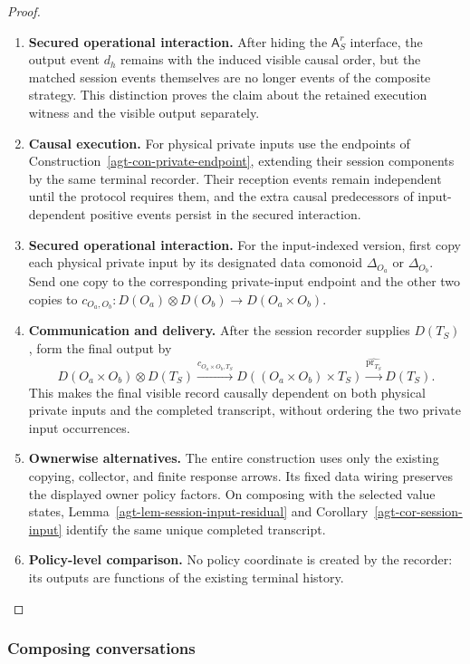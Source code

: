 \documentclass[11pt,a4paper]{article}
\numberwithin{equation}{section}
\theoremstyle{definition}
\theoremstyle{remark}
\theoremstyle{plain}
\begin{document}
\begin{proof}
\begin{enumerate}[label=\textup{(\arabic*)},leftmargin=*,itemsep=4pt,topsep=3pt]
completed matching explicitly records the internal session events and
the final record occurrence.
  \item \textbf{Secured operational interaction.} After hiding the $\mathsf A_S^r$
interface, the output event $d_h$ remains with the induced visible
causal order, but the matched session events themselves are no longer
events of the composite strategy. This distinction proves the claim
about the retained execution witness and the visible output separately.
  \item \textbf{Causal execution.} For physical private inputs use the endpoints of
Construction~\ref{agt-con-private-endpoint}, extending their session
components by the same terminal recorder. Their reception events
remain independent until the protocol requires them, and the extra
causal predecessors of input-dependent positive events persist in the
secured interaction.
  \item \textbf{Secured operational interaction.} For the input-indexed version, first copy each physical private input
by its designated data comonoid $\Delta_{O_a}$ or $\Delta_{O_b}$. Send one copy to the corresponding private-input endpoint and the
other two copies to $c_{O_a,O_b}:D(O_a)\otimes D(O_b)\to D(O_a\times O_b)$.
  \item \textbf{Communication and delivery.} After the session recorder supplies $D(T_S)$, form the final output by
\[
 D(O_a\times O_b)\otimes D(T_S)
 \xrightarrow{c_{O_a\times O_b,T_S}}
 D((O_a\times O_b)\times T_S)
 \xrightarrow{\widehat{\operatorname{pr}_{T_S}}}D(T_S).
\]
This makes the final visible record causally dependent on both physical
private inputs and the completed transcript, without ordering the two
private input occurrences.
  \item \textbf{Ownerwise alternatives.} The entire construction uses only the
existing copying, collector, and finite response arrows. Its fixed data wiring preserves the displayed owner policy factors. On composing
with the selected value states,
Lemma~\ref{agt-lem-session-input-residual} and
Corollary~\ref{agt-cor-session-input} identify the same unique
completed transcript.
  \item \textbf{Policy-level comparison.} No policy coordinate is created by the
recorder: its outputs are functions of the existing terminal history.
\end{enumerate}
\end{proof}


\subsubsection{Composing conversations}
\end{document}
